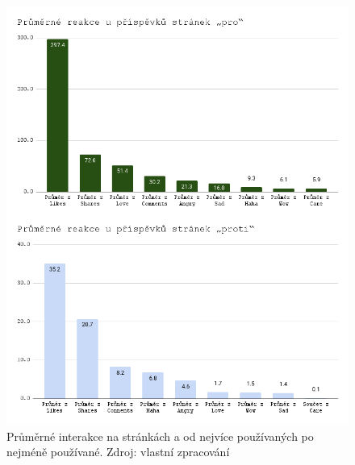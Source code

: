      \begin{figure}[H]
        \includegraphics[width=14cm]{obrazky/Průměrné reakce u příspěvků stránek.png}
        \centering
        \caption[Průměrné interakce na stránkách  a ]{Průměrné interakce na stránkách  a  od nejvíce používaných po nejméně používané. Zdroj: vlastní zpracování}
        \label{fig:fb-klima-stranky-reakce}
    \end{figure}